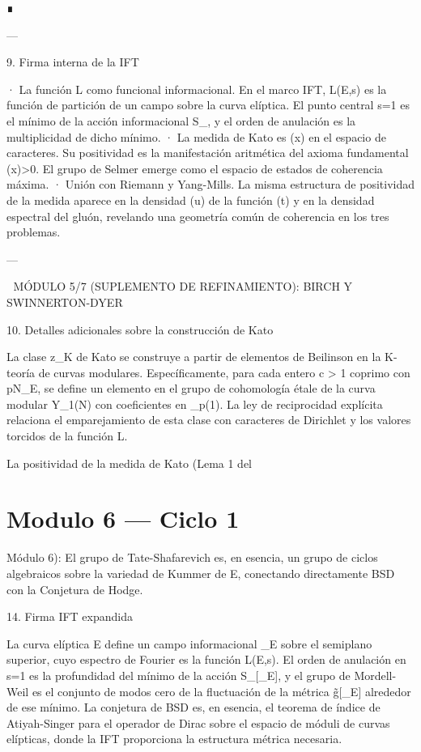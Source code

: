 \documentclass[12pt,twoside]{book}
\begin{document}
∎

---

9. Firma interna de la IFT

· La función L como funcional informacional. En el marco IFT, L(E,s) es la función de partición de un campo \rho sobre la curva elíptica. El punto central s=1 es el mínimo de la acción informacional S_{}, y el orden de anulación es la multiplicidad de dicho mínimo.
· La medida de Kato es \rho(x) en el espacio de caracteres. Su positividad es la manifestación aritmética del axioma fundamental \rho(x)>0. El grupo de Selmer emerge como el espacio de estados de coherencia máxima.
· Unión con Riemann y Yang-Mills. La misma estructura de positividad de la medida aparece en la densidad \Phi(u) de la función \Xi(t) y en la densidad espectral del gluón, revelando una geometría común de coherencia en los tres problemas.

---

🧬 MÓDULO 5/7 (SUPLEMENTO DE REFINAMIENTO): BIRCH Y SWINNERTON-DYER

10. Detalles adicionales sobre la construcción de Kato

La clase z_K de Kato se construye a partir de elementos de Beilinson en la K-teoría de curvas modulares. Específicamente, para cada entero c > 1 coprimo con pN_E, se define un elemento en el grupo de cohomología étale de la curva modular Y_1(N) con coeficientes en _p(1). La ley de reciprocidad explícita relaciona el emparejamiento de esta clase con caracteres de Dirichlet y los valores torcidos de la función L.

La positividad de la medida de Kato (Lema 1 del 

\chapter{Modulo 6 — Ciclo 1}
Módulo 6): El grupo de Tate-Shafarevich es, en esencia, un grupo de ciclos algebraicos sobre la variedad de Kummer de E, conectando directamente BSD con la Conjetura de Hodge.

14. Firma IFT expandida

La curva elíptica E define un campo informacional \rho_E sobre el semiplano superior, cuyo espectro de Fourier es la función L(E,s). El orden de anulación en s=1 es la profundidad del mínimo de la acción S_{}[\rho_E], y el grupo de Mordell-Weil es el conjunto de modos cero de la fluctuación de la métrica g̃[\rho_E] alrededor de ese mínimo. La conjetura de BSD es, en esencia, el teorema de índice de Atiyah-Singer para el operador de Dirac sobre el espacio de móduli de curvas elípticas, donde la IFT proporciona la estructura métrica necesaria.
\end{document}
